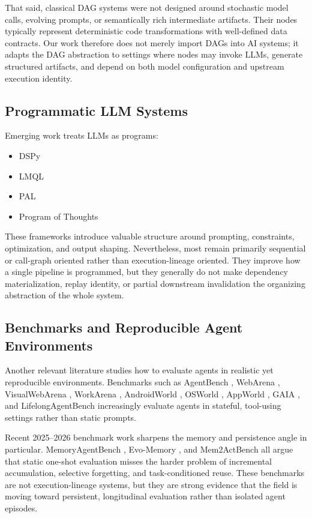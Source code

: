 \documentclass{article}
\begin{document}
That said, classical DAG systems were not designed around stochastic model calls, evolving prompts, or semantically rich intermediate artifacts. Their nodes typically represent deterministic code transformations with well-defined data contracts. Our work therefore does not merely import DAGs into AI systems; it adapts the DAG abstraction to settings where nodes may invoke LLMs, generate structured artifacts, and depend on both model configuration and upstream execution identity.

\subsection{Programmatic LLM Systems}

Emerging work treats LLMs as programs:
\begin{itemize}
\item DSPy \cite{khattab2023dspy}
\item LMQL \cite{beurer2023lmql}
\item PAL \cite{gao2023pal}
\item Program of Thoughts \cite{chen2022pot}
\end{itemize}

These frameworks introduce valuable structure around prompting, constraints, optimization, and output shaping. Nevertheless, most remain primarily sequential or call-graph oriented rather than execution-lineage oriented. They improve how a single pipeline is programmed, but they generally do not make dependency materialization, replay identity, or partial downstream invalidation the organizing abstraction of the whole system.

\subsection{Benchmarks and Reproducible Agent Environments}

Another relevant literature studies how to evaluate agents in realistic yet reproducible environments. Benchmarks such as AgentBench \cite{liu2023agentbench}, WebArena \cite{zhou2023webarena}, VisualWebArena \cite{koh2024visualwebarena}, WorkArena \cite{drouin2024workarena}, AndroidWorld \cite{rawles2024androidworld}, OSWorld \cite{xie2024osworld}, AppWorld \cite{trivedi2024appworld}, GAIA \cite{mialon2023gaia}, and LifelongAgentBench \cite{zheng2025lifelongagentbench} increasingly evaluate agents in stateful, tool-using settings rather than static prompts.

Recent 2025--2026 benchmark work sharpens the memory and persistence angle in particular. MemoryAgentBench \cite{hu2025memoryagentbench}, Evo-Memory \cite{wei2025evomemory}, and Mem2ActBench \cite{shen2026mem2actbench} all argue that static one-shot evaluation misses the harder problem of incremental accumulation, selective forgetting, and task-conditioned reuse. These benchmarks are not execution-lineage systems, but they are strong evidence that the field is moving toward persistent, longitudinal evaluation rather than isolated agent episodes.
\end{document}
